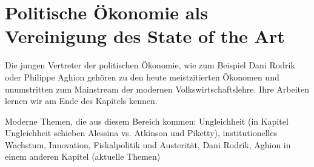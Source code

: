 \section{Politische Ökonomie als Vereinigung des State of the Art}

Die jungen Vertreter der politischen Ökonomie, wie zum Beispiel Dani Rodrik oder Philippe Aghion gehören zu den heute meistzitierten Ökonomen und unumstritten zum Mainstream der modernen Volkswirtschaftslehre. Ihre Arbeiten lernen wir am Ende des Kapitels kennen. 








Moderne Themen, die aus diesem Bereich kommen: Ungleichheit (in Kapitel Ungleichheit schieben Alessina vs. Atkinson und Piketty), institutionelles Wachstum, Innovation, Fiskalpolitik und Austerität, Dani Rodrik, Aghion in einem anderen Kapitel (aktuelle Themen)









